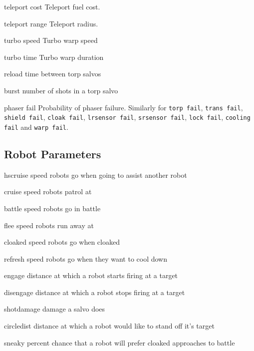 \begin{list}{}
\item[teleport cost]  Teleport fuel cost.
\item[teleport range]  Teleport radius.
\item[turbo speed]  Turbo warp speed 
\item[turbo time]  Turbo warp duration 
\item[reload] time between torp salvos
\item[burst] number of shots in a torp salvo
\item[phaser fail]  Probability of phaser failure.  Similarly for 
{\tt torp fail}, {\tt trans fail}, {\tt shield fail}, 
 {\tt cloak fail}, {\tt lrsensor fail}, {\tt srsensor fail}, {\tt lock fail},
{\tt cooling fail} and {\tt warp fail}.
\end{list}

\subsection{Robot Parameters}
\begin{list}{}{ \renewcommand{\makelabel}[1]{{\tt #1 \hfill}} 
\setlength{\leftmargin}{2.5cm} \setlength{\labelwidth}{\leftmargin}
\setlength{\labelsep}{0in}
         \setlength{\itemsep}{.2em}
}
\item[hscruise] speed robots go when going to assist another robot 
\item[cruise] speed robots patrol at
\item[battle] speed robots go in battle
\item[flee] speed robots run away at
\item[cloaked] speed robots go when cloaked
\item[refresh] speed robots go when they want to cool down
\item[engage] distance at which a robot starts firing at a target
\item[disengage] distance at which a robot stops firing at a target
\item[shotdamage] damage a salvo does
\item[circledist] distance at which a robot would like to stand off it's target
\item[sneaky] percent chance that a robot will prefer cloaked approaches to battle
\end{list}

